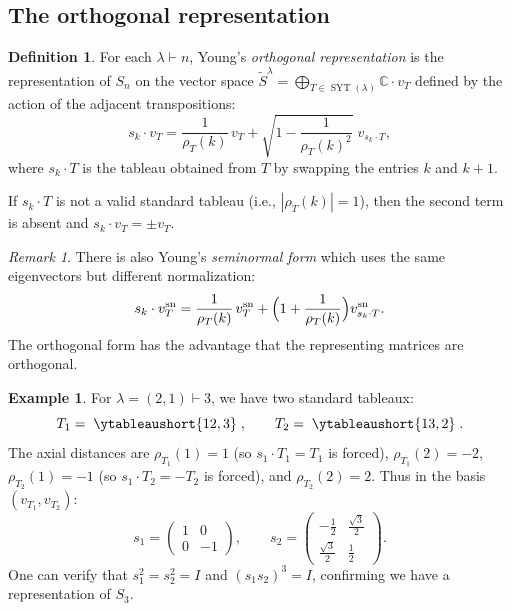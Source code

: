 \documentclass[12pt,a4paper]{article}
\theoremstyle{definition}
\newtheorem{definition}[theorem]{Definition}
\newtheorem{example}[theorem]{Example}
\theoremstyle{remark}
\newtheorem{remark}[theorem]{Remark}
\newcommand{\C}{\mathbb{C}}
\newcommand{\SYT}{\operatorname{SYT}}
\begin{document}
\subsection{The orthogonal representation}

\begin{definition}\label{def:Young-orth}
For each $\lambda \vdash n$, Young's \emph{orthogonal representation}
is the representation of $S_n$ on the vector space
$\widetilde{S}^\lambda = \bigoplus_{T \in \SYT(\lambda)} \C \cdot v_T$
defined by the action of the adjacent transpositions:
\begin{equation}\label{eq:Young-orth}
  s_k \cdot v_T = \frac{1}{\rho_T(k)}\, v_T
  + \sqrt{1 - \frac{1}{\rho_T(k)^2}}\; v_{s_k \cdot T},
\end{equation}
where $s_k \cdot T$ is the tableau obtained from $T$ by swapping the
entries $k$ and $k{+}1$.

If $s_k \cdot T$ is not a valid standard tableau (i.e.,
$|\rho_T(k)| = 1$), then the second term is absent and
$s_k \cdot v_T = \pm v_T$.
\end{definition}

\begin{remark}
There is also Young's \emph{seminormal form} which uses the same
eigenvectors but different normalization:
\[
  s_k \cdot v_T^{\mathrm{sn}} = \frac{1}{\rho_T(k)}\, v_T^{\mathrm{sn}}
  + \Bigl(1 + \frac{1}{\rho_T(k)}\Bigr) v_{s_k \cdot T}^{\mathrm{sn}}.
\]
The orthogonal form has the advantage that the representing matrices
are orthogonal.
\end{remark}

\begin{example}\label{ex:S3-21}
For $\lambda = (2,1) \vdash 3$, we have two standard tableaux:
\[
  T_1 = \;\ytableaushort{12,3}\;, \qquad
  T_2 = \;\ytableaushort{13,2}\;.
\]
The axial distances are $\rho_{T_1}(1) = 1$ (so $s_1 \cdot T_1 =
T_1$ is forced), $\rho_{T_1}(2) = -2$, $\rho_{T_2}(1) = -1$ (so
$s_1 \cdot T_2 = -T_2$ is forced), and $\rho_{T_2}(2) = 2$. Thus in
the basis $(v_{T_1}, v_{T_2})$:
\[
  s_1 = \begin{pmatrix} 1 & 0 \\ 0 & -1 \end{pmatrix},
  \qquad
  s_2 = \begin{pmatrix} -\frac{1}{2} & \frac{\sqrt{3}}{2} \\[4pt]
    \frac{\sqrt{3}}{2} & \frac{1}{2} \end{pmatrix}.
\]
One can verify that $s_1^2 = s_2^2 = I$ and $(s_1 s_2)^3 = I$,
confirming we have a representation of $S_3$.
\end{example}
\end{document}
